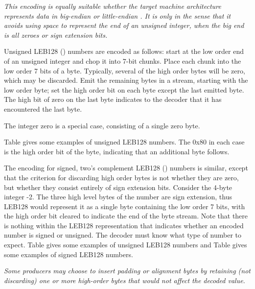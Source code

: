 \textit{This encoding is equally suitable whether the target machine
architecture represents data in big-endian or little-endian
\byteorder. It is  only in the sense that it
avoids using space to represent the  end of an
unsigned integer, when the big end is all zeroes or sign
extension bits.}

Unsigned LEB128 () 
numbers are encoded as follows:
start at the low order end of an unsigned integer and chop
it into 7-bit chunks. Place each chunk into the low order 7
bits of a byte. Typically, several of the high order bytes
will be 
\bb
zero, which may be discarded. 
\eb
Emit the remaining bytes in a
stream, starting with the low order byte; set the high order
bit on each byte except the last emitted byte. The high bit
of zero on the last byte indicates to the decoder that it
has encountered the last byte.

The integer zero is a special case, consisting of a single
zero byte.

Table 
gives some examples of unsigned LEB128
numbers. The
0x80 in each case is the high order bit of the byte, indicating
that an additional byte follows.


The encoding for signed, two\textquoteright{s} complement LEB128 
() 
numbers is similar, except that the criterion for discarding
high order bytes is not whether they are zero, but whether
they consist entirely of sign extension bits. Consider the
4-byte integer -2. The three high level bytes of the number
are sign extension, thus LEB128 would represent it as a single
byte containing the low order 7 bits, with the high order
bit cleared to indicate the end of the byte stream. Note
that there is nothing within the LEB128 representation that
indicates whether an encoded number is signed or unsigned. The
decoder must know what type of number to expect. 
Table 
gives some examples of unsigned LEB128
numbers and Table 
gives some examples of signed LEB128 
numbers.

\bb
\textit{Some producers may choose to insert padding or alignment bytes by 
retaining (not discarding) one or more high-order bytes that would 
not affect the decoded value.}
\eb

